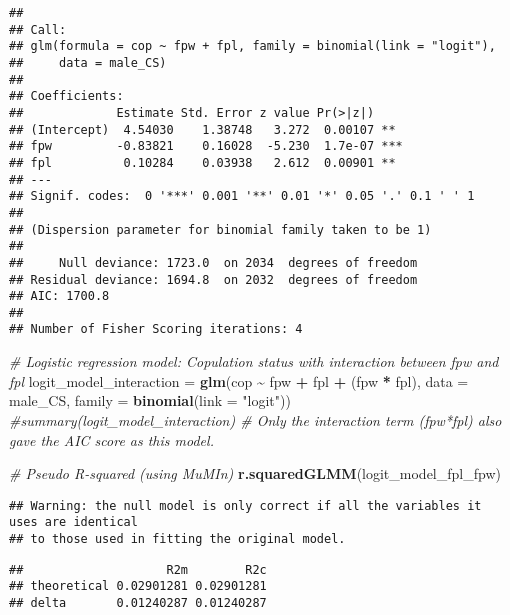 \documentclass[
]{article}
\newenvironment{Shaded}{\begin{snugshade}}{\end{snugshade}}
\newcommand{\AttributeTok}[1]{\textcolor[rgb]{0.13,0.29,0.53}{#1}}
\newcommand{\CommentTok}[1]{\textcolor[rgb]{0.56,0.35,0.01}{\textit{#1}}}
\newcommand{\DecValTok}[1]{\textcolor[rgb]{0.00,0.00,0.81}{#1}}
\newcommand{\FunctionTok}[1]{\textcolor[rgb]{0.13,0.29,0.53}{\textbf{#1}}}
\newcommand{\NormalTok}[1]{#1}
\newcommand{\OtherTok}[1]{\textcolor[rgb]{0.56,0.35,0.01}{#1}}
\newcommand{\SpecialCharTok}[1]{\textcolor[rgb]{0.81,0.36,0.00}{\textbf{#1}}}
\newcommand{\StringTok}[1]{\textcolor[rgb]{0.31,0.60,0.02}{#1}}
\begin{document}
\begin{verbatim}
## 
## Call:
## glm(formula = cop ~ fpw + fpl, family = binomial(link = "logit"), 
##     data = male_CS)
## 
## Coefficients:
##             Estimate Std. Error z value Pr(>|z|)    
## (Intercept)  4.54030    1.38748   3.272  0.00107 ** 
## fpw         -0.83821    0.16028  -5.230  1.7e-07 ***
## fpl          0.10284    0.03938   2.612  0.00901 ** 
## ---
## Signif. codes:  0 '***' 0.001 '**' 0.01 '*' 0.05 '.' 0.1 ' ' 1
## 
## (Dispersion parameter for binomial family taken to be 1)
## 
##     Null deviance: 1723.0  on 2034  degrees of freedom
## Residual deviance: 1694.8  on 2032  degrees of freedom
## AIC: 1700.8
## 
## Number of Fisher Scoring iterations: 4
\end{verbatim}

\begin{Shaded}
\begin{Highlighting}[]
\CommentTok{\# Logistic regression model: Copulation status with interaction between fpw and fpl}
\NormalTok{logit\_model\_interaction }\OtherTok{=} \FunctionTok{glm}\NormalTok{(cop }\SpecialCharTok{\textasciitilde{}}\NormalTok{ fpw }\SpecialCharTok{+}\NormalTok{ fpl }\SpecialCharTok{+}\NormalTok{ (fpw }\SpecialCharTok{*}\NormalTok{ fpl), }\AttributeTok{data =}\NormalTok{ male\_CS, }\AttributeTok{family =} \FunctionTok{binomial}\NormalTok{(}\AttributeTok{link =} \StringTok{"logit"}\NormalTok{))}
\CommentTok{\#summary(logit\_model\_interaction) \# Only the interaction term (fpw*fpl) also gave the AIC score as this model.}


\CommentTok{\# Pseudo R{-}squared (using MuMIn)}
\FunctionTok{r.squaredGLMM}\NormalTok{(logit\_model\_fpl\_fpw)}
\end{Highlighting}
\end{Shaded}

\begin{verbatim}
## Warning: the null model is only correct if all the variables it uses are identical 
## to those used in fitting the original model.
\end{verbatim}

\begin{verbatim}
##                    R2m        R2c
## theoretical 0.02901281 0.02901281
## delta       0.01240287 0.01240287
\end{verbatim}

\begin{Shaded}
\end{Shaded}
\end{document}
